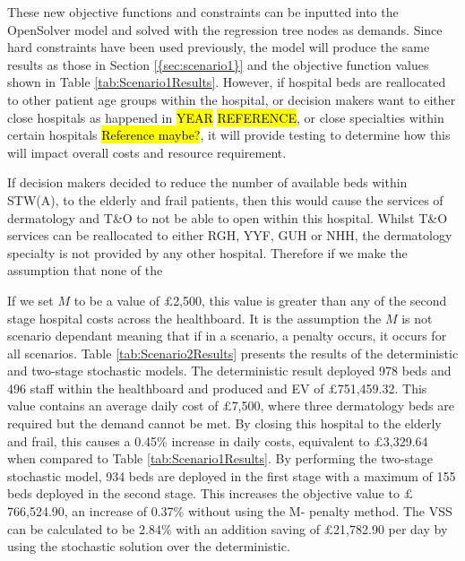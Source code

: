 \documentclass[../thesis.tex]{subfiles}
\begin{document}
These new objective functions and constraints can be inputted into the OpenSolver model and solved with the regression tree nodes as demands. Since hard constraints have been used previously, the model will produce the same results as those in Section \ref{{sec:scenario1}} and the objective function values shown in Table \ref{tab:Scenario1Results}. However, if hospital beds are reallocated to other patient age groups within the hospital, or decision makers want to either close hospitals as happened in \hl{YEAR} \hl{REFERENCE}, or close specialties within certain hospitals \hl{Reference maybe?}, it will provide testing to determine how this will impact overall costs and resource requirement. 

If decision makers decided to reduce the number of available beds within  STW(A), to the elderly and frail patients, then this would cause the services of dermatology and T\&O to not be able to open within this hospital. Whilst T\&O services can be reallocated to either RGH, YYF, GUH or NHH, the dermatology specialty is not provided by any other hospital. Therefore if we make the assumption that none of the 

If we set $M$ to be a value of $\pounds$2,500, this value is greater than any of the second stage hospital costs across the healthboard. It is the assumption the $M$ is not scenario dependant meaning that if in a scenario, a penalty occurs, it occurs for all scenarios. Table \ref{tab:Scenario2Results} presents the results of the deterministic and two-stage stochastic models. The deterministic result deployed 978 beds and 496 staff within the healthboard and produced and EV of $\pounds$751,459.32. This value contains an average daily cost of $\pounds$7,500, where three dermatology beds are required but the demand cannot be met. By closing this hospital to the elderly and frail, this causes a 0.45\% increase in daily costs, equivalent to $\pounds$3,329.64 when compared to Table \ref{tab:Scenario1Results}. By performing the two-stage stochastic model, 934 beds are deployed in the first stage with a maximum of 155 beds deployed in the second stage. This increases the objective value to $\pounds$766,524.90, an increase of 0.37\% without using the M- penalty method. The VSS can be calculated to be 2.84\% with an addition saving of $\pounds$21,782.90 per day by using the stochastic solution over the deterministic.
\end{document}

